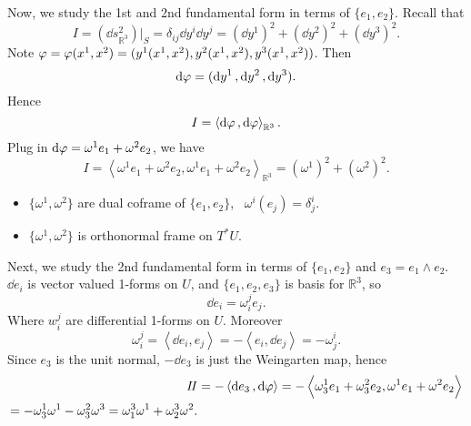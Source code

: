 Now, we study the 1st and 2nd fundamental form in terms of \(\{e_1,e_2\}\).
Recall that \[
    I=(\dd{s}^2_{\mathbb{R}^3})\big|_S=\delta_{ij}\dd{y^i}\dd{y^j}
    =(\dd{y^1})^2+(\dd{y^2})^2+(\dd{y^3})^2
.\] Note \(\varphi=\varphi(x^1,x^2)=(y^1(x^1,x^2),y^2(x^1,x^2),y^3(x^1,x^2))\). Then \[
    \dd{\varphi}=(\dd{y^1},\dd{y^2},\dd{y^3})
.\] Hence \[
    I=\left<\dd{\varphi},\dd{\varphi}\right> _{\mathbb{R}^3}
.\] Plug in \(\dd{\varphi}=\omega^1e_1+\omega^2e_2\), we have \[
    I=\left<\omega^1e_1+\omega^2e_2,\omega^1e_1+\omega^2e_2\right>_{\mathbb{R}^3}
    =(\omega^1)^2+(\omega^2)^2
.\]
\begin{remark}\hfill
\begin{itemize}
\item \(\{\omega^1,\omega^2\}\) are dual coframe of \(\{e_1,e_2\}\), \ie\ \(\omega^i
    (e_j)=\delta^i_j\).
\item \(\{\omega^1,\omega^2\}\) is orthonormal frame on \(T^*U\).
\end{itemize}
\end{remark}

Next, we study the 2nd fundamental form in terms of \(\{e_1,e_2\}\) and \(e_3=e_1
\wedge e_2\). \(\dd{e_i}\) is vector valued 1-forms on \(U\), and \(\{e_1,e_2,e_3\}\)
is basis for \(\mathbb{R}^3\), so \[
    \dd{e_i}=\omega_i^je_j
.\] Where \(w_i^j\) are differential 1-forms on \(U\). Moreover \[
    \omega_i^j=\left<\dd{e_i},e_j\right> =-\left<e_i,\dd{e_j}\right> =-\omega_j^i
.\] Since \(e_3\) is the unit normal, \(-\dd{e_3}\) is just the Weingarten map, hence
\begin{align*}
    I\!I&=-\left<\dd{e_3},\dd{\varphi}\right> =-\left<\omega_3^1e_1+\omega_3^2e_2,
    \omega^1e_1+\omega^2e_2\right> \\
    =-\omega_3^1\omega^1-\omega_3^2\omega^3=\omega_1^3\omega^1+\omega_2^3\omega^2
.\end{align*}

